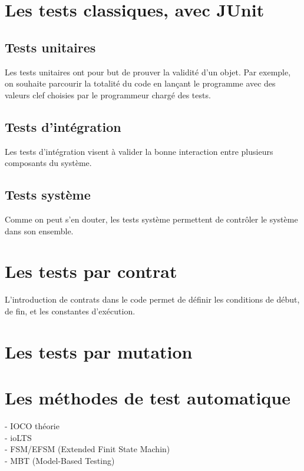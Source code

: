 \documentclass[a4paper]{report}
\begin{document}
\section*{Les tests classiques, avec JUnit}

\subsection*{Tests unitaires}
Les tests unitaires ont pour but de prouver la validité d'un objet. Par exemple, on souhaite parcourir la totalité du code en lançant le programme avec des valeurs clef choisies par le programmeur chargé des tests.

\subsection*{Tests d'intégration}
Les tests d'intégration visent à valider la bonne interaction entre plusieurs composants du système.

\subsection*{Tests système}
Comme on peut s'en douter, les tests système permettent de contrôler le système dans son ensemble.

\section*{Les tests par contrat}
L'introduction de contrats dans le code permet de définir les conditions de début, de fin, et les constantes d'exécution.
\section*{Les tests par mutation}

\section*{Les méthodes de test automatique}
- IOCO théorie\\
- ioLTS\\
- FSM/EFSM (Extended Finit State Machin)\\
- MBT (Model-Based Testing)\\
\end{document}
